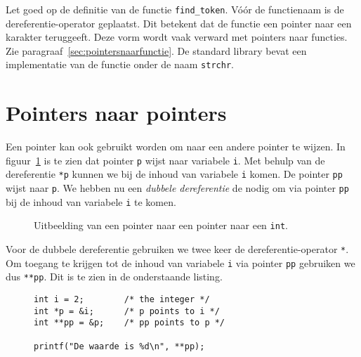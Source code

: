 
Let goed op de definitie van de functie \texttt{find\_token}. Vóór de functienaam is de dereferentie-operator geplaatst. Dit betekent dat de functie een pointer naar een karakter teruggeeft. Deze vorm wordt vaak verward met pointers naar functies. Zie paragraaf~\ref{sec:pointersnaarfunctie}. De standard library bevat een implementatie van de functie onder de naam \lstinline|strchr|.


\section{Pointers naar pointers}
\label{sec:pointersnaarpointers}
Een pointer kan ook gebruikt worden om naar een andere pointer te wijzen. In figuur~\ref{fig:poipointertopointer} is te zien dat pointer \texttt{p} wijst naar variabele \texttt{i}. Met behulp van de dereferentie \texttt{*p} kunnen we bij de inhoud van variabele \texttt{i} komen. De pointer \texttt{pp} wijst naar \texttt{p}. We hebben nu een \textsl{dubbele dereferentie} de nodig om via pointer \texttt{pp} bij de inhoud van variabele \texttt{i} te komen. 

\begin{figure}[!ht]
\centering
{}
\caption{Uitbeelding van een pointer naar een pointer naar een \texttt{int}.}
\label{fig:poipointertopointer}
\end{figure}

Voor de dubbele dereferentie gebruiken we twee keer de dereferentie-operator \texttt{*}. Om toegang te krijgen tot de inhoud van variabele \texttt{i} via pointer \texttt{pp} gebruiken we dus \texttt{**pp}. Dit is te zien in de onderstaande listing.

\begin{figure}[!ht]
\begin{lstlisting}[caption=Voorbeeld van een pointer naar een pointer.]
int i = 2;        /* the integer */
int *p = &i;      /* p points to i */
int **pp = &p;    /* pp points to p */

printf("De waarde is %d\n", **pp);
\end{lstlisting}
\end{figure}

